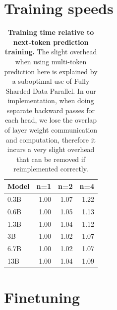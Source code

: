 \documentclass{article}
\theoremstyle{plain}
\theoremstyle{definition}
\theoremstyle{remark}
\begin{document}
\section{Training speeds}
\begin{table}[!h]
    \centering
        \caption{\textbf{Training time relative to next-token prediction training.} The slight overhead when using multi-token prediction here is explained by a suboptimal use of Fully Sharded Data Parallel. In our implementation, when doing separate backward passes for each head, we lose the overlap of layer weight communication and computation, therefore it incurs a very slight overhead that can be removed if reimplemented correctly.}
    \label{tab:wps}
    \begin{tabular}{lrrr}
        \toprule
        Model & n=1 & n=2 & n=4 \\
        \midrule
        0.3B & 1.00 & 1.07 & 1.22 \\
        0.6B & 1.00 & 1.05 & 1.13 \\
        1.3B & 1.00 & 1.04 & 1.12 \\
        3B & 1.00 & 1.02 & 1.07 \\
        6.7B & 1.00 & 1.02 & 1.07 \\
        13B & 1.00 & 1.04 & 1.09 \\
        \bottomrule
    \end{tabular}
\end{table}

\section{Finetuning}
\begin{table}[ht!]
    \centering
    \caption{\textbf{Finetuning LLama 2 with multi-token prediction does not significantly improve performance.} We tried to finetune LLama 2 with 4-token prediction but this did not yield significant improvements compared to the baseline. We suppose that this new loss changes the initialization too brutally and never really recovers. We still some improvements for example on MBPP Pass@1. All runs use 200B tokens of code.}
\label{tab:finetune_llama}
\end{table}
\end{document}
